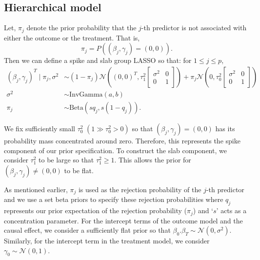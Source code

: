 \documentclass{amsart}
\newcommand{\normal}{\mathcal{N}}
\begin{document}
\subsection{Hierarchical model}

Let, $\pi_j$ denote the prior probability that the $j$-th
predictor is not associated with either the outcome or the 
treatment. That is, 
\begin{equation}
	\pi_j = P\left((\beta_j,\gamma_j)=(0,0)\right).
\end{equation}
Then we can define a spike and slab group LASSO so that:
for $1\le j\le p$,
\begin{align}
(\beta_j,\gamma_j)^T \mid \pi_{j}, \sigma^2 &\sim 
(1-\pi_{j})\normal\left( (0,0)^T, 
\tau_1^2\begin{bmatrix}
\sigma^2 & 0 \\
0 & 1
\end{bmatrix}\right)
+ \pi_{j} \normal\left(0, 
\tau_0^2\begin{bmatrix}
\sigma^2 & 0 \\
0 & 1
\end{bmatrix}\right)\\
\sigma^2&\sim \text{InvGamma}(a, b)\\
\pi_{j} &\sim\text{Beta}\left(sq_j, s(1-q_j)\right).
\end{align}

We fix sufficiently small $\tau^2_0$
$(1\gg\tau_0^2>0)$ so that  $(\beta_j, \gamma_j) = (0,0)$ has its probability mass 
concentrated around zero. Therefore, this represents the spike component of our prior specification. 
To construct the slab component, we consider $\tau_1^2$ to be large so that 
$\tau_1^2\ge 1$. This allows the prior for $(\beta_j, \gamma_j)\not=(0,0)$ to be flat.

As mentioned earlier, $\pi_j$ is used as the rejection probability
of the $j$-th predictor and we use a set beta priors to specify 
these rejection probabilities where  $q_j$ represents our prior expectation of the rejection probability ($\pi_j$) and `$s$' acts as 
a concentration parameter.
For the intercept terms of the outcome model and the causal effect, 
we consider a sufficiently flat prior so that 
$\beta_0. \beta_T\sim \normal(0,\sigma^2)$. Similarly, for the
intercept term in the treatment model, we consider 
$\gamma_0\sim \normal(0,1)$. 
\end{document}
